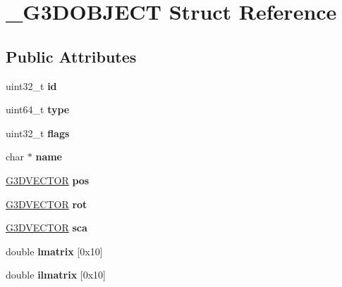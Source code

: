 \hypertarget{struct__G3DOBJECT}{}\section{\+\_\+\+G3\+D\+O\+B\+J\+E\+CT Struct Reference}
\label{struct__G3DOBJECT}
\subsection*{Public Attributes}
\begin{DoxyCompactItemize}
\item 
\mbox{\label{struct__G3DOBJECT_a69681d20105aefe83abbc3d59d2f561c}} 
uint32\+\_\+t {\bfseries id}
\item 
\mbox{\label{struct__G3DOBJECT_a11eb99cc5843ff98073188bd286651c1}} 
uint64\+\_\+t {\bfseries type}
\item 
\mbox{\label{struct__G3DOBJECT_ab507547d4c680ea5110a798df8bf1d3d}} 
uint32\+\_\+t {\bfseries flags}
\item 
\mbox{\label{struct__G3DOBJECT_a3eabe10b862e2ea77791290e3f9f141c}} 
char $\ast$ {\bfseries name}
\item 
\mbox{\label{struct__G3DOBJECT_a51b3e335e7f3c8e91bb9578a9ee78ba0}} 
\hyperlink{structG3DVECTOR}{G3\+D\+V\+E\+C\+T\+OR} {\bfseries pos}
\item 
\mbox{\label{struct__G3DOBJECT_a5632596d106877925c15dff0fc01874c}} 
\hyperlink{structG3DVECTOR}{G3\+D\+V\+E\+C\+T\+OR} {\bfseries rot}
\item 
\mbox{\label{struct__G3DOBJECT_aa148a60e9a33aa85aa937c18e101502c}} 
\hyperlink{structG3DVECTOR}{G3\+D\+V\+E\+C\+T\+OR} {\bfseries sca}
\item 
\mbox{\label{struct__G3DOBJECT_a419a6f6de03c8b069eddf638a09b035f}} 
double {\bfseries lmatrix} \mbox{[}0x10\mbox{]}
\item 
\mbox{\label{struct__G3DOBJECT_a34b0fbe4b519638ade1102fc27e000fc}} 
double {\bfseries ilmatrix} \mbox{[}0x10\mbox{]}

\end{DoxyCompactItemize}
